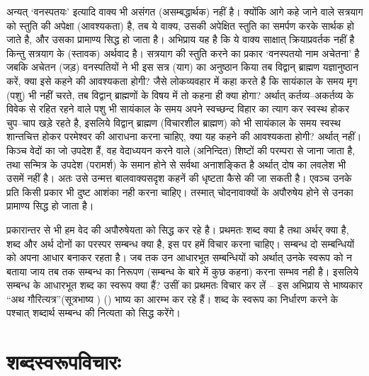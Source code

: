 अन्यत् ‘वनस्पतयः' इत्यादि वाक्य भी असंगत (असम्बद्धार्थक) नहीं है। क्योंकि आगे कहे जाने वाले सत्रयाग को स्तुति की अपेक्षा (आवश्यकता) है, तब ये वाक्य, उसकी अपेक्षित स्तुति का समर्पण करके सार्थक हो जाते है, और उसका प्रामाण्य सिद्ध हो जाता है। अभिप्राय यह है कि ये वाक्य साक्षात् क्रियाप्रवर्तक नहीं है किन्तु सत्रयाग के (स्तावक) अर्थवाद है। सत्रयाग की स्तुति करने का प्रकार ‘वनस्पतयो नाम अचेतना' है जबकि अचेतन (जड़) वनस्पतियों ने भी इस सत्र (याग) का अनुष्ठान किया तब विद्वान् ब्राह्मण यज्ञानुष्ठान करें, क्या इसे कहने की आवश्यकता होगी? जैसे लोकव्यवहार में कहा करते है कि सायंकाल के समय मृग (पशु) भी नहीं चरते, तब विद्वान् ब्राह्मणों के विषय में तो कहना ही क्या होगा? अर्थात् कर्तव्य–अकर्तव्य के विवेक से रहित रहने वाले पशु भी सायंकाल के समय अपने स्वच्छन्द विहार का त्याग कर स्वस्थ होकर चुप–चाप खड़े रहते है, इसलिये विद्वान् ब्राह्मण (विचारशील ब्राह्मण) को भी सायंकाल के समय स्वस्थ शान्तचित्त होकर परमेश्वर की आराधना करना चाहिए, क्या यह कहने की आवश्यकता होगी? अर्थात् नहीं। किञ्च वेदों का जो उपदेश हैं, वह वेदाध्ययन करने वाले (अनिन्दित) शिष्टों की परम्परा से जाना जाता है, तथा सन्मित्र के उपदेश (परामर्श) के समान होने से सर्वथा अनाशङ्कित है अर्थात् दोष का लवलेश भी उसमें नहीं है। अतः उसे उन्मत्त बालवाक्यसदृश कहनें की धृष्टता कैसे की जा सकती है। एवञ्च उनके प्रति किसी प्रकार भी दुष्ट आशंका नही करना चाहिए। तस्मात् चोदनावाक्यों के अपौरुषेय होने से उनका प्रामाण्य सिद्ध हो जाता है।

प्रकारान्तर से भी हम वेद की अपौरुषेयता को सिद्ध कर रहे है। प्रथमतः शब्द क्या है तथा अर्थर् क्या है, शब्द और अर्थ दोनों का परस्पर सम्बन्ध क्या है, इस पर हमें विचार करना चाहिए। सम्बन्ध दो सम्बन्धियों को अपना आधार बनाकर रहता है। जब तक उन आधारभूत सम्बन्धियों को अर्थात् उनके स्वरूप को न बताया जाय तब तक सम्बन्ध का निरूपण (सम्बन्ध के बारे में कुछ कहना) करना सम्भव नही है। इसलिये सम्बन्ध के आधारभूत शब्द का स्वरूप क्या हैं? उसीं का प्रथमतः विचार कर लें – इस अभिप्राय से भाष्यकार “अथ गौरित्यत्र”(सूत्रभाष्य ) () भाष्य का आरम्भ कर रहे हैं। शब्द के स्वरूप का निर्धारण करने के पश्चात् शब्दार्थ सम्बन्ध की नित्यता को सिद्ध करेंगे।


\section*{शब्दस्वरूपविचारः}

